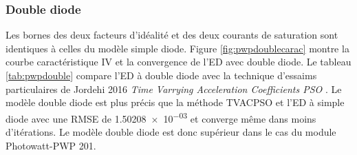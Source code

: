 \subsubsection{Double diode}
Les bornes des deux facteurs d'idéalité et des deux courants de saturation sont identiques à celles du modèle simple diode. Figure \ref{fig:pwpdoublecarac} montre la courbe caractéristique IV et la convergence de l'ED avec double diode. Le tableau \ref{tab:pwpdouble} compare l'ED à double diode avec la technique d'essaims particulaires de Jordehi 2016 \textit{Time Varrying Acceleration Coefficients PSO} \cite{Jordehi2016}. Le modèle double diode est plus précis que la méthode TVACPSO  et l'ED à simple diode avec une RMSE de \num{1.50208e-03} et converge même dans moins d'itérations. Le modèle double diode est donc supérieur dans le cas du module Photowatt-PWP 201.
